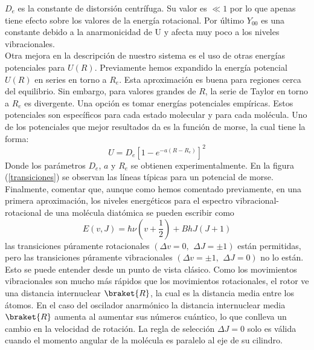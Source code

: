 \documentclass[a4paper]{article}
\begin{document}
{$D_e$ es la constante de distorsión centrífuga. Su valor es $\ll 1$ por lo que apenas tiene efecto sobre los valores de la energía rotacional. Por último $Y_{00}$ es una constante debido a la anarmonicidad de U y afecta muy poco a los niveles vibracionales.\\
 
Otra mejora en la descripción de nuestro sistema es el uso de otras energías potenciales para $U(R)$. Previamente hemos expandido la energía potencial $U(R)$ en series en torno a $R_e$. Esta aproximación es buena para regiones cerca del equilibrio. Sin embargo, para valores grandes de $R$, la serie de Taylor en torno a $R_e$ es divergente. Una opción es tomar energías potenciales empíricas. Estos potenciales son específicos para cada estado molecular y para cada molécula. Uno de los potenciales que mejor resultados da es la función de morse, la cual tiene la forma:
\begin{equation}
U=D_e \left[ 1- e^{-a(R-R_e)} \right]^2
\end{equation}
Donde los parámetros $D_e$, $a$ y $R_e$ se obtienen experimentalmente. En la figura (\ref{transiciones}) se observan las líneas típicas para un potencial de morse.\\

Finalmente, comentar que, aunque como hemos comentado previamente, en una primera aproximación, los niveles energéticos para el espectro vibracional-rotacional de una molécula diatómica se pueden escribir como
\begin{equation}
E(v,J)=\hbar\nu(v+\frac{1}{2})+ BhJ(J+1)
\end{equation}
las transiciones púramente rotacionales $(\Delta v = 0, \,\ \Delta J = \pm 1)$ están permitidas, pero las transiciones púramente vibracionales $(\Delta v = \pm 1, \,\ \Delta J = 0)$ no lo están. Esto se puede entender desde un punto de vista clásico. Como los movimientos vibracionales son mucho más rápidos que los movimientos rotacionales, el rotor ve una distancia internuclear $\braket{R}$, la cual es la distancia media entre los átomos. En el caso del oscilador anarmónico la distancia internuclear media $\braket{R}$ aumenta al aumentar sus números cuántico, lo que conlleva un cambio en la velocidad de rotación. La regla de selección $\Delta J=0$ solo es válida cuando el momento angular de la molécula es paralelo al eje de su cilindro.

}
\end{document}
